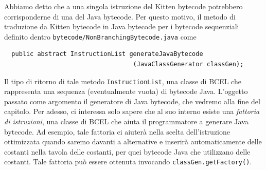 Abbiamo detto che a una singola istruzione del Kitten bytecode potrebbero
corrisponderne \piu di una del Java bytecode. Per questo motivo, il metodo
di traduzione da Kitten bytecode in Java bytecode per i bytecode sequenziali
\e definito dentro \texttt{bytecode/NonBranchingBytecode.java} come
%
\begin{verbatim}
  public abstract InstructionList generateJavaBytecode
                                   (JavaClassGenerator classGen);
\end{verbatim}
%
Il tipo di ritorno di tale metodo
\e \texttt{InstructionList}, \cioe una classe di BCEL che rappresenta
una sequenza (eventualmente vuota) di bytecode Java.
L'oggetto passato come argomento \e il generatore di Java bytecode, che vedremo
alla fine del capitolo. Per adesso, ci interessa solo sapere che al
suo interno esiste una \emph{fattoria di istruzioni}, \cioe una classe
di BCEL che aiuta il programmatore a generare Java bytecode. Ad esempio,
tale fattoria ci aiuter\`a nella scelta dell'istruzione \piu ottimizzata
quando saremo davanti a \piu alternative e inserir\`a automaticamente
delle costanti nella tavola delle costanti, per quei bytecode Java che
utilizzano delle costanti. Tale fattoria pu\`o essere ottenuta invocando
\texttt{classGen.getFactory()}.

